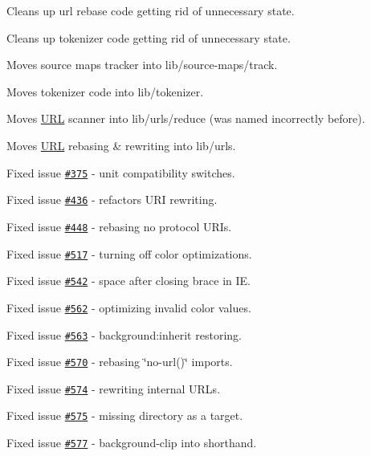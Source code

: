 \begin{DoxyItemize}
\item Cleans up url rebase code getting rid of unnecessary state.
\item Cleans up tokenizer code getting rid of unnecessary state.
\item Moves source maps tracker into lib/source-\/maps/track.
\item Moves tokenizer code into lib/tokenizer.
\item Moves \mbox{\hyperlink{namespace_u_r_l}{U\+RL}} scanner into lib/urls/reduce (was named incorrectly before).
\item Moves \mbox{\hyperlink{namespace_u_r_l}{U\+RL}} rebasing \& rewriting into lib/urls.
\item Fixed issue \href{https://github.com/jakubpawlowicz/clean-css/issues/375}{\tt \#375} -\/ unit compatibility switches.
\item Fixed issue \href{https://github.com/jakubpawlowicz/clean-css/issues/436}{\tt \#436} -\/ refactors U\+RI rewriting.
\item Fixed issue \href{https://github.com/jakubpawlowicz/clean-css/issues/448}{\tt \#448} -\/ rebasing no protocol U\+R\+Is.
\item Fixed issue \href{https://github.com/jakubpawlowicz/clean-css/issues/517}{\tt \#517} -\/ turning off color optimizations.
\item Fixed issue \href{https://github.com/jakubpawlowicz/clean-css/issues/542}{\tt \#542} -\/ space after closing brace in IE.
\item Fixed issue \href{https://github.com/jakubpawlowicz/clean-css/issues/562}{\tt \#562} -\/ optimizing invalid color values.
\item Fixed issue \href{https://github.com/jakubpawlowicz/clean-css/issues/563}{\tt \#563} -\/ {\ttfamily background\+:inherit} restoring.
\item Fixed issue \href{https://github.com/jakubpawlowicz/clean-css/issues/570}{\tt \#570} -\/ rebasing \char`\"{}no-\/url()\char`\"{} imports.
\item Fixed issue \href{https://github.com/jakubpawlowicz/clean-css/issues/574}{\tt \#574} -\/ rewriting internal U\+R\+Ls.
\item Fixed issue \href{https://github.com/jakubpawlowicz/clean-css/issues/575}{\tt \#575} -\/ missing directory as a {\ttfamily target}.
\item Fixed issue \href{https://github.com/jakubpawlowicz/clean-css/issues/577}{\tt \#577} -\/ {\ttfamily background-\/clip} into shorthand.

\end{DoxyItemize}
